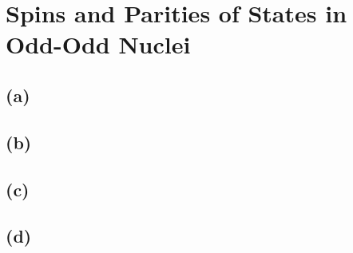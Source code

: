 \section{Spins and Parities of States in Odd-Odd Nuclei}
\subsection*{(a)}

\subsection*{(b)}
\subsection*{(c)}
\subsection*{(d)}